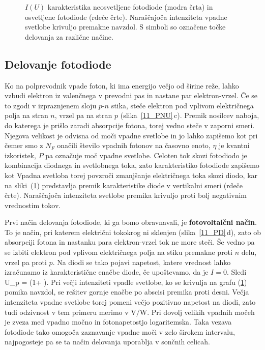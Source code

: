 \begin{figure}[h]
\centering
\def\svgwidth{100truemm} 

\caption{$I(U)$ karakteristika neosvetljene fotodiode (modra črta)
in osvetljene fotodiode (rdeče črte). Naraščajoča intenziteta vpadne svetlobe
krivuljo premakne navzdol. S simboli so označene točke delovanja za različne načine.
}
\label{11_IU}
\end{figure}
 
\subsection*{Delovanje fotodiode}
Ko na polprevodnik vpade foton, ki ima energijo večjo od širine reže, 
lahko vzbudi elektron iz valenčnega v prevodni pas in nastane par elektron-vrzel. 
Če se to zgodi v izpraznjenem sloju $p$-$n$ stika, steče elektron pod vplivom 
električnega polja na stran $n$, vrzel pa na stran $p$ (slika~\ref{11_PNU}\,c). 
Premik nosilcev naboja, do katerega je prišlo zaradi absorpcije fotona, 
torej vedno steče v zaporni smeri. 
Njegova velikost je odvisna od moči vpadne svetlobe in jo lahko zapišemo kot  
pri čemer smo z $N_F$ onačili število vpadnih fotonov na časovno enoto, 
$\eta$ je kvantni izkoristek,
$P$ pa označuje moč vpadne svetlobe. Celoten tok skozi fotodiodo je kombinacija diodnega 
in svetlobnega toka, zato karakteristiko fotodiode zapišemo kot 
Vpadna svetloba torej povzroči zmanjšanje električnega toka skozi diodo, 
kar na sliki~(\ref{11_IU}) predstavlja premik karakteristike diode v vertikalni 
smeri (rdeče črte). Naraščajoča intenziteta svetlobe premika krivuljo proti 
bolj negativnim vrednostim tokov. 

Prvi način delovanja fotodiode, ki ga bomo obravnavali, je {\bf fotovoltaični način}.
To je način, pri katerem električni tokokrog ni sklenjen (slika~\ref{11_PD}\,d), 
zato ob absorpciji fotona in nastanku
para elektron-vrzel tok ne more steči. Še vedno pa se izbiti elektron pod vplivom električnega polja
na stiku premakne proti $n$ delu, vrzel pa proti $p$. Na diodi se tako pojavi napetost, 
katere vrednost lahko izračunamo iz karakteristične enačbe diode, če upoštevamo, da je $I=0$. Sledi
\beq
U_p = \ln \left(1+ \right).
\eeq
Pri večji intenziteti vpadle svetlobe, ko se krivulja na grafu (\ref{11_IU}) pomika navzdol, se rešitev
gornje enačbe po abscisi premika proti desni. Večja intenziteta vpadne svetlobe torej pomeni večjo 
pozitivno napetost na diodi, zato tudi odzivnost v tem primeru merimo v $\si{\volt}/\si{\watt}$.
Pri dovolj velikih vpadnih močeh je zveza med vpadno močno in fotonapetostjo
logaritemska. Taka vezava fotodiode tako omogoča zaznavanje vpadne moči v zelo širokem intervalu,
najpogosteje pa se ta način delovanja uporablja v sončnih celicah. 


